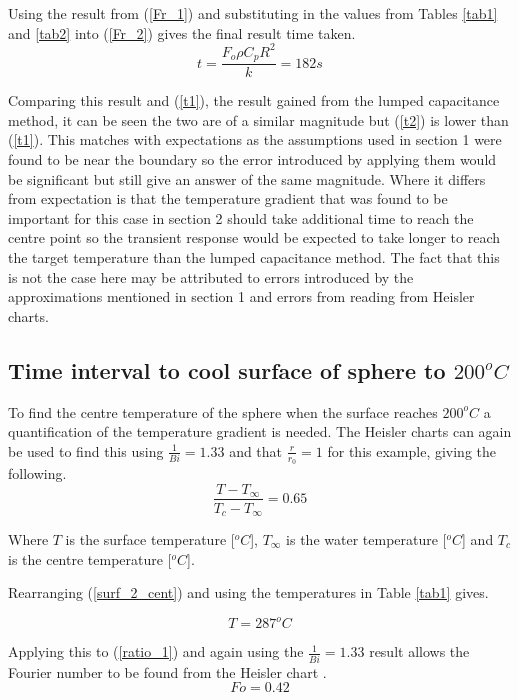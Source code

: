 \documentclass[11pt]{article}
\begin{document}
Using the result from (\ref{Fr_1}) and substituting in the values from Tables \ref{tab1} and \ref{tab2} into (\ref{Fr_2}) gives the final result time taken.
\boldmath
\begin{equation}\label{t2}
	t = \frac{F_{o}\rho C_{p} R^{2}}{k} = 182 s
\end{equation}
\unboldmath

Comparing this result and (\ref{t1}), the result gained from the lumped capacitance method, it can be seen the two are of a similar magnitude but (\ref{t2}) is lower than (\ref{t1}). This matches with expectations as the assumptions used in section 1 were found to be near the boundary so the error introduced by applying them would be significant but still give an answer of the same magnitude. Where it differs from expectation is that the temperature gradient that was found to be important for this case in section 2 should take additional time to reach the centre point so the transient response would be expected to take longer to reach the target temperature than the lumped capacitance method. The fact that this is not the case here may be attributed to errors introduced by the approximations mentioned in section 1 and errors from reading from Heisler charts.

\subsection{Time interval to cool surface of sphere to $200 ^{o}C$}
To find the centre temperature of the sphere when the surface reaches $200 ^{o}C$ a quantification of the temperature gradient is needed. The Heisler charts can again be used to find this using $\frac{1}{Bi}=1.33$ and that $\frac{r}{r_{0}}= 1$ for this example, giving the following.
\begin{equation}\label{surf_2_cent}
	\frac{T - T_{\infty}}{T_{c}-T_{\infty}} = 0.65
\end{equation}

Where $T$ is the surface temperature [$^{o}C$], $T_{\infty}$ is the water temperature [$^{o}C$] and $T_c$ is the centre temperature [$^{o}C$].

Rearranging (\ref{surf_2_cent}) and using the temperatures in Table \ref{tab1} gives.

\begin{equation}\label{cent_temp}
	T = 287 ^{o}C
\end{equation}

Applying this to (\ref{ratio_1}) and again using the $\frac{1}{Bi}=1.33$ result allows the Fourier number to be found from the Heisler chart \cite{bergman_fundamentals_2011}.
\begin{equation}\label{fo_2}
	Fo = 0.42
\end{equation}
\end{document}
